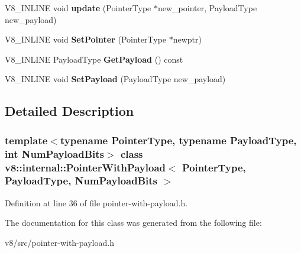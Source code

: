 \begin{DoxyCompactItemize}
V8\+\_\+\+I\+N\+L\+I\+NE void {\bfseries update} (Pointer\+Type $\ast$new\+\_\+pointer, Payload\+Type new\+\_\+payload)
\item 
\mbox{\label{classv8_1_1internal_1_1PointerWithPayload_af10709200236bcf4c3d98a1038c2f7d1}} 
V8\+\_\+\+I\+N\+L\+I\+NE void {\bfseries Set\+Pointer} (Pointer\+Type $\ast$newptr)
\item 
\mbox{\label{classv8_1_1internal_1_1PointerWithPayload_a0fcf0e0ea91eb63d2b0cde9b74dbcaf6}} 
V8\+\_\+\+I\+N\+L\+I\+NE Payload\+Type {\bfseries Get\+Payload} () const
\item 
\mbox{\label{classv8_1_1internal_1_1PointerWithPayload_ac7ef5443ad6c7f0f9973e9eb55eb288e}} 
V8\+\_\+\+I\+N\+L\+I\+NE void {\bfseries Set\+Payload} (Payload\+Type new\+\_\+payload)
\end{DoxyCompactItemize}


\subsection{Detailed Description}
\subsubsection*{template$<$typename Pointer\+Type, typename Payload\+Type, int Num\+Payload\+Bits$>$\newline
class v8\+::internal\+::\+Pointer\+With\+Payload$<$ Pointer\+Type, Payload\+Type, Num\+Payload\+Bits $>$}



Definition at line 36 of file pointer-\/with-\/payload.\+h.



The documentation for this class was generated from the following file\+:\begin{DoxyCompactItemize}
\item 
v8/src/pointer-\/with-\/payload.\+h\end{DoxyCompactItemize}
